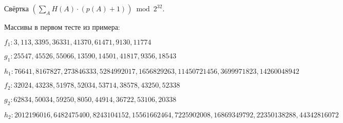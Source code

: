 \begin{problem}{Свёртка}
$\left(\sum\limits_A H(A) \cdot (p(A)+1)\right) \bmod 2^{32}\text{.}$

\Examples

\begin{example}
%
%
\end{example}

\Explanations

Массивы в первом тесте из примера:

{\footnotesize{
$f_1 \colon 3,113,3395,36331,41370,61471,9130,11774$

$g_1 \colon 25547,45526,55066,13590,14501,41817,9356,18543$

$h_1 \colon 76641,8167827,273846333,5284992017,1656829263,11450721456,3699971823,14260048942$

$f_2 \colon 32024,43238,51978,52034,53714,38578,43250,52338$

$g_2 \colon 62834,50034,59250,8050,44914,36722,53106,20338$

$h_2 \colon 2012196016,6482475400,8243104152,15561662464,7225902008,16869349792,22350138288,44342816072$

}}
\end{problem}
